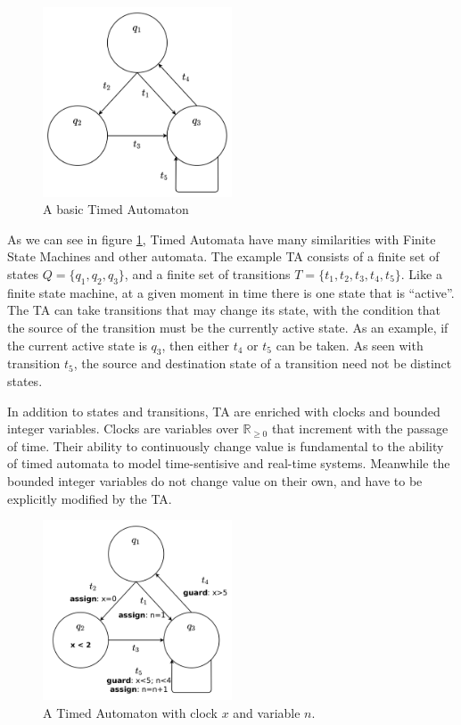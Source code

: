 \documentclass[a4paper,12pt]{article}
\begin{document}
%    
\begin{figure}[h]
  \centering
  \includegraphics[width=0.5\textwidth]{exampleTA-blank}
  \caption{A basic Timed Automaton}
  \label{fig:example-blank}
\end{figure}

As we can see in figure \ref{fig:example-blank}, Timed Automata have many
similarities with Finite State Machines and other automata. The example TA
consists of a finite set of states $Q = \{q_{1},q_{2},q_{3}\}$, and a finite set
of transitions $T = \{t_{1},t_{2},t_{3},t_{4},t_{5}\}$. Like a finite state
machine, at a given moment in time there is one state that is ``active''. The TA
can take transitions that may change its state, with the condition that the
source of the transition must be the currently active state. As an example, if
the current active state is $q_{3}$, then either $t_{4}$ or $t_{5}$ can be
taken. As seen with transition $t_{5}$, the source and destination state of a
transition need not be distinct states.

In addition to states and transitions, TA are enriched with clocks and bounded
integer variables. Clocks are variables over $\mathbb{R}_{\geq 0}$ that increment with the
passage of time. Their ability to continuously change value is fundamental to
the ability of timed automata to model time-sentisive and real-time systems.
Meanwhile the bounded integer variables do not change value on their own, and
have to be explicitly modified by the TA.

\begin{figure}[h]
  \centering
  \includegraphics[width=0.5\textwidth]{exampleTA-big}
  \caption{A Timed Automaton with clock $x$ and variable $n$.}
  \label{fig:example-big}
\end{figure}
\end{document}
